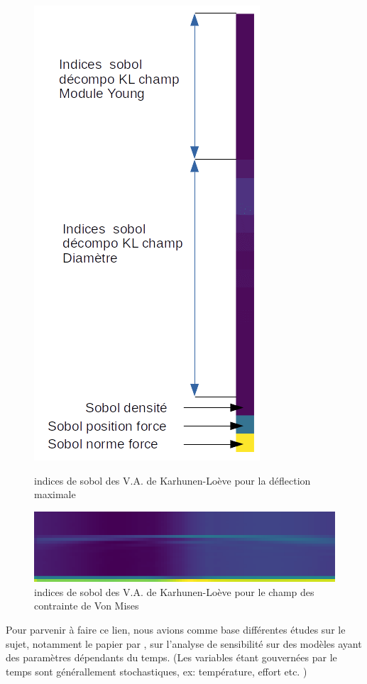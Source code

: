 \documentclass[a4paper,10pt]{article}
\begin{document}
\begin{figure}[H]
    \centering
    \begin{minipage}{0.45\textwidth}
        \centering
        \includegraphics[height=1\textwidth]{sensitivity_rv_KL_anno.png} %
        \caption{indices de sobol des V.A. de Karhunen-Loève pour la déflection maximale}
    \end{minipage}\hfill
    \begin{minipage}{0.45\textwidth}
        \centering
        \includegraphics[width=1.35\textwidth]{sensitivity_field_KL.png} %
        \caption{indices de sobol des V.A. de Karhunen-Loève pour le champ des contrainte de Von Mises}
    \end{minipage}
\end{figure}

Pour parvenir à faire ce lien, nous avions comme base différentes études sur le sujet, notamment le papier par \cite{Wei2017May}, sur l'analyse de sensibilité sur des modèles ayant des paramètres dépendants du temps. (Les variables étant gouvernées par le temps sont générallement stochastiques, ex: température, effort etc. ) \\
\end{document}
